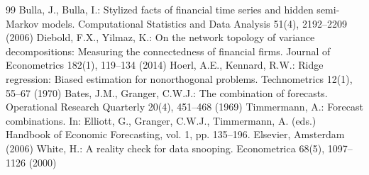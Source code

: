 \documentclass[10pt]{article}
\begin{document}
\begin{thebibliography}{99}
 Bulla, J., Bulla, I.: Stylized facts of financial time series and hidden semi-Markov models. Computational Statistics and Data Analysis 51(4), 2192--2209 (2006)
 Diebold, F.X., Yilmaz, K.: On the network topology of variance decompositions: Measuring the connectedness of financial firms. Journal of Econometrics 182(1), 119--134 (2014)
 Hoerl, A.E., Kennard, R.W.: Ridge regression: Biased estimation for nonorthogonal problems. Technometrics 12(1), 55--67 (1970)
 Bates, J.M., Granger, C.W.J.: The combination of forecasts. Operational Research Quarterly 20(4), 451--468 (1969)
 Timmermann, A.: Forecast combinations. In: Elliott, G., Granger, C.W.J., Timmermann, A. (eds.) Handbook of Economic Forecasting, vol. 1, pp. 135--196. Elsevier, Amsterdam (2006)
 White, H.: A reality check for data snooping. Econometrica 68(5), 1097--1126 (2000)
\end{thebibliography}
\end{document}
